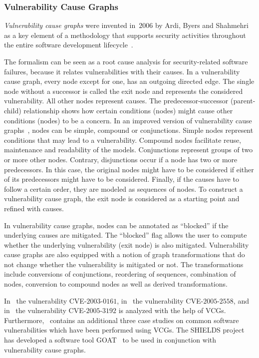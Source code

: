 \documentclass[a4paper]{article}
\begin{document}
\subsubsection{Vulnerability Cause Graphs} 
\label{sec:vulnerability_cause_graphs}

\emph{Vulnerability cause graphs} were invented in~$2006$ by Ardi, Byers and
Shahmehri as a key element of a methodology that supports security activities
throughout the entire software development lifecycle~\cite{ArBySh}.

The formalism can be seen as a root cause analysis for security-related software
failures, because it relates vulnerabilities with their causes. In a
vulnerability cause graph, every node except for one, has an outgoing directed
edge. The single node without a successor is called the exit node and represents
the considered vulnerability. All other nodes represent causes. The
predecessor-successor (parent-child) relationship shows how certain conditions
(nodes) might cause other conditions (nodes) to be a concern. In an improved
version of vulnerability cause graphs~\cite{ByArShDu}, nodes can be simple,
compound or conjunctions. Simple nodes represent conditions that may lead to a 
vulnerability. Compound nodes facilitate reuse, maintenance and readability of 
the models. Conjunctions represent groups of two or more other nodes. Contrary,
disjunctions occur if a node has two or more predecessors. In this case, the
original nodes might have to be considered if either of its predecessors might
have to be considered. Finally, if the causes have to follow a certain order,
they are modeled as sequences of nodes. To construct a vulnerability cause
graph, the exit node is considered as a starting point and refined with causes.

In vulnerability cause graphs, nodes can be annotated as ``blocked'' if the
underlying causes are mitigated. The ``blocked'' flag allows the user to compute
whether the underlying vulnerability (exit node) is also mitigated.
Vulnerability cause graphs are also equipped with a notion of graph
transformations that do not change whether the vulnerability is mitigated or
not. The transformations include conversions of conjunctions, reordering of
sequences, combination of nodes, conversion to compound nodes as well as derived
transformations.

In~\cite{ByArShDu} the vulnerability CVE-$2003$-$0161$, in~\cite{BySh3} the 
vulnerability CVE-$2005$-$2558$, and  in~\cite{MaCaMoArBySh} the vulnerability
CVE-$2005$-$3192$ is analyzed with the help of VCGs. Furthermore,~\cite{ChHa}
contains an additional three case studies on common software vulnerabilities
which have been performed using VCGs. The SHIELDS project~\cite{Website_SHIELDS}
has developed a software tool GOAT~\cite{GOAT} to be used in conjunction with
vulnerability cause graphs.
\end{document}
